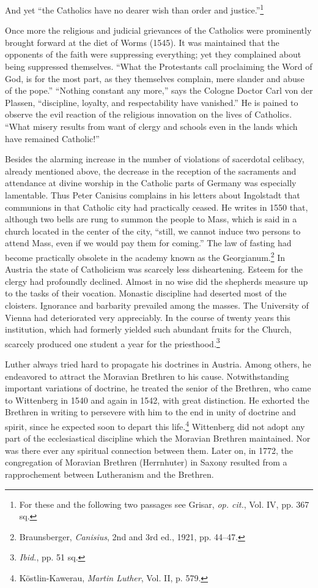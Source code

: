 And yet “the Catholics have no dearer wish than order and justice.”\footnote{For these and the following two passages see Grisar, \textit{op. cit.}, Vol. IV, pp. 367 sq.}

Once more the religious and judicial grievances of the Catholics were
prominently brought forward at the diet of Worms (1545). It was
maintained that the opponents of the faith were suppressing everything;
yet they complained about being suppressed themselves. “What
the Protestants call proclaiming the Word of God, is for the most
part, as they themselves complain, mere slander and abuse of the
pope.” “Nothing constant any more,” says the Cologne Doctor Carl
von der Plassen, “discipline, loyalty, and respectability have vanished.”
He is pained to observe the evil reaction of the religious innovation
on the lives of Catholics. “What misery results from want
of clergy and schools even in the lands which have remained Catholic!”

Besides the alarming increase in the number of violations of sacerdotal
celibacy, already mentioned above, the decrease in the reception
of the sacraments and attendance at divine worship in the Catholic
parts of Germany was especially lamentable. Thus Peter Canisius
complains in his letters about Ingolstadt that communions in that
Catholic city had practically ceased. He writes in 1550 that, although
two bells are rung to summon the people to Mass, which is said in a
church located in the center of the city, “still, we cannot induce two
persons to attend Mass, even if we would pay them for coming.” The
law of fasting had become practically obsolete in the academy known
as the Georgianum.\footnote{Braunsberger, \textit{Canisius}, 2nd and 3rd ed., 1921, pp. 44--47.}
 In Austria the state of Catholicism was scarcely
less disheartening. Esteem for the clergy had profoundly declined.
Almost in no wise did the shepherds measure up to the tasks of their
vocation. Monastic discipline had deserted most of the cloisters.
Ignorance and barbarity prevailed among the masses. The University of
Vienna had deteriorated very appreciably. In the course of twenty
years this institution, which had formerly yielded such abundant
fruits for the Church, scarcely produced one student a year for the
priesthood.\footnote{\textit{Ibid.}, pp. 51 sq.}

Luther always tried hard to propagate his doctrines in Austria.
Among others, he endeavored to attract the Moravian Brethren to
his cause. Notwithstanding important variations of doctrine, he
treated the senior of the Brethren, who came to Wittenberg in 1540
and again in 1542, with great distinction. He exhorted the Brethren
in writing to persevere with him to the end in unity of doctrine and
spirit, since he expected soon to depart this life.\footnote{Köstlin-Kawerau, \textit{Martin Luther}, Vol. II, p. 579.}
Wittenberg did
not adopt any part of the ecclesiastical discipline which the Moravian
Brethren maintained. Nor was there ever any spiritual connection
between them. Later on, in 1772, the congregation of Moravian
Brethren (Herrnhuter) in Saxony resulted from a rapprochement
between Lutheranism and the Brethren.

